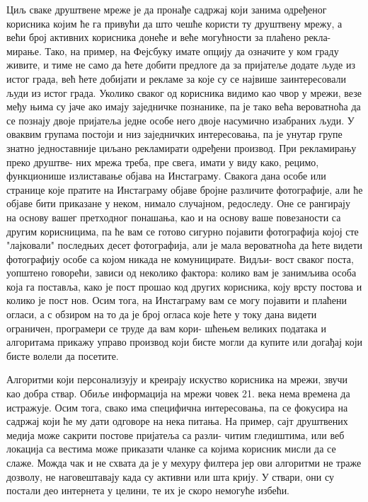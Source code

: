 \documentclass[a4paper]{article}
\begin{document}
Циљ сваке друштвене мреже је да пронађе садржај који занима одређеног корисника којим ће га привући да што чешће користи ту друштвену мрежу, а већи број активних корисника донеће и веће могућности за плаћено рекла-
мирање. Тако, на пример, на Фејсбуку имате опцију да означите у ком граду живите, и тиме не само да ћете добити предлоге да за пријатеље додате људе из истог града, већ ћете добијати и рекламе за које су се највише заинтересовали људи из истог града. Уколико сваког од корисника видимо као чвор у мрежи, везе међу њима су јаче ако имају заједничке познанике, па је тако већа вероватноћа да се познају двоје пријатеља једне особе него двоје насумично изабраних људи. У оваквим групама постоји и низ заједничких интересовања, па је унутар групе знатно једноставније циљано рекламирати одређени производ. При рекламирању преко друштве-
них мрежа треба, пре свега, имати у виду како, рецимо, функционише излиставање објава на Инстаграму. Свакога дана особе или странице које пратите на Инстаграму објаве бројне различите фотографије, али ће објаве бити приказане у неком, нимало случајном, редоследу. Оне се рангирају на основу вашег претходног понашања, као и на основу ваше повезаности са другим корисницима, па ће вам се готово сигурно појавити фотографија којој сте "лајковали" последњих десет фотографија, али је мала вероватноћа да ћете видети фотографију особе са којом никада не комуницирате. Видљи-
вост сваког поста, уопштено говорећи, зависи од неколико фактора: колико вам је занимљива особа која га поставља, како је пост прошао код других корисника, коју врсту постова и колико је пост нов. Осим тога, на Инстаграму вам се могу појавити и плаћени огласи, а с обзиром на то да је број огласа које ћете у току дана видети ограничен, програмери се труде да вам кори-
шћењем великих података и алгоритама прикажу управо производ који бисте могли да купите или догађај који бисте волели да посетите.

Алгоритми који персонализују и креирају искуство корисника на мрежи, звучи као добра ствар. Обиље информација на мрежи човек 21. века нема времена да истражује. Осим тога, свако има специфична интересовања, па се фокусира на садржај који ће му дати одговоре на нека питања. На пример, сајт друштвених медија може сакрити постове пријатеља са разли-
читим гледиштима, или веб локација са вестима може приказати чланке са којима корисник мисли да се слаже. Можда чак и не схвата да је у мехуру филтера јер ови алгоритми не траже дозволу, не наговештавају када су активни или шта крију. У ствари, они су постали део интернета у целини, те их је скоро немогуће избећи.
\end{document}
